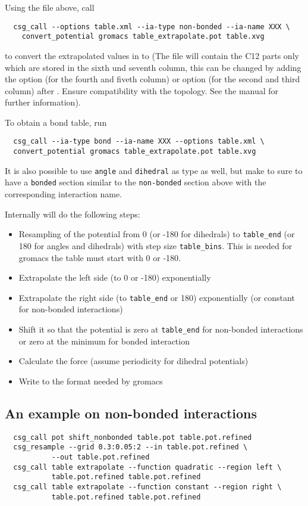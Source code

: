 Using the  file above, call
\begin{verbatim}
  csg_call --options table.xml --ia-type non-bonded --ia-name XXX \
    convert_potential gromacs table_extrapolate.pot table.xvg
\end{verbatim}
to convert the extrapolated values in  to  (The file will contain the \gromacs C12 parts only which are stored in the sixth und seventh column, this can be changed by adding the  option (for the fourth and fiveth column) or  option (for the second and third column) after . Ensure compatibility with the \gromacs topology. See the \gromacs manual for further information).

To obtain a bond table, run
\begin{verbatim}
  csg_call --ia-type bond --ia-name XXX --options table.xml \
  convert_potential gromacs table_extrapolate.pot table.xvg
\end{verbatim}
It is also possible to use \texttt{angle} and \texttt{dihedral} as type as well, but make to sure to have a \texttt{bonded} section similar to the \texttt{non-bonded} section above with the corresponding interaction name.

Internally \progopt{convert\_potential gromacs} will do the following steps:
\begin{itemize}
\item Resampling of the potential from 0 (or -180 for dihedrals) to \texttt{table\_end} (or 180 for angles and dihedrals) with step size \texttt{table\_bins}. This is needed for gromacs the table must start with 0 or -180.
\item Extrapolate the left side (to 0 or -180) exponentially
\item Extrapolate the right side (to \texttt{table\_end} or 180) exponentially (or constant for non-bonded interactions)
\item Shift it so that the potential is zero at \texttt{table\_end} for non-bonded interactions or zero at the minimum for bonded interaction
\item Calculate the force (assume periodicity for dihedral potentials)
\item Write to the format needed by gromacs
\end{itemize}

\subsection{An example on non-bonded interactions}
\begin{verbatim}
  csg_call pot shift_nonbonded table.pot table.pot.refined
  csg_resample --grid 0.3:0.05:2 --in table.pot.refined \
           --out table.pot.refined
  csg_call table extrapolate --function quadratic --region left \
           table.pot.refined table.pot.refined
  csg_call table extrapolate --function constant --region right \
           table.pot.refined table.pot.refined
\end{verbatim}

